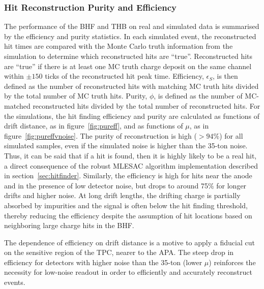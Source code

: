 \documentclass[10pt,a4paper]{article}
\begin{document}
\subsubsection{Hit Reconstruction Purity and Efficiency}\label{sec:hitefficiency}

The performance of the BHF and THB on real and simulated data is summarised by the efficiency and purity statistics. In each simulated event, the reconstructed hit times are compared with the Monte Carlo truth information from the simulation to determine which reconstructed hits are ``true''. Reconstructed hits are ``true'' if there is at least one MC truth charge deposit on the same channel within $\pm 150$ ticks of the reconstructed hit peak time. Efficiency, $\epsilon_S$, is then defined as the number of reconstructed hits with matching MC truth hits divided by the total number of MC truth hits. Purity, $\phi$, is defined as the number of MC-matched reconstructed hits divided by the total number of reconstructed hits. For the simulations, the hit finding efficiency and purity are calculated as functions of drift distance, as in figure~\ref{fig:pureff}, and as functions of $\mu$, as in figure~\ref{fig:pureffvnoise}. The purity of reconstruction is high ($>94\%$) for all simulated samples, even if the simulated noise is higher than the 35-ton noise. Thus, it can be said that if a hit is found, then it is highly likely to be a real hit, a direct consequence of the robust MLESAC algorithm implementation described in section~\ref{sec:hitfinder}. Similarly, the efficiency is high for hits near the anode and in the presence of low detector noise, but drops to around 75\% for longer drifts and higher noise. At long drift lengths, the drifting charge is partially absorbed by impurities and the signal is often below the hit finding threshold, thereby reducing the efficiency despite the assumption of hit locations based on neighboring large charge hits in the BHF. 

The dependence of efficiency on drift distance is a motive to apply a fiducial cut on the sensitive region of the TPC, nearer to the APA. The steep drop in efficiency for detectors with higher noise than the 35-ton (lower $\mu$) reinforces the necessity for low-noise readout in order to efficiently and accurately reconstruct events. 
\end{document}
